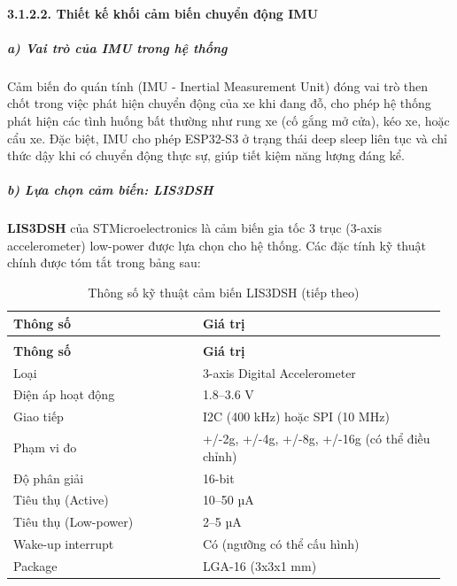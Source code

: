 \documentclass[a4paper]{extarticle}
\newcommand{\thesissettableid}[2]{%
  \renewcommand{\thetable}{#1}%
  \renewcommand{\theHtable}{#2}%
}
\begin{document}
\paragraph{3.1.2.2. Thiết kế khối cảm biến chuyển động
IMU}\label{3212-thiux1ebft-kux1ebf-muxf4-ux111un-cux1ea3m-biux1ebfn-chuyux1ec3n-ux111ux1ed9ng-imu}

\subparagraph{a) Vai trò của IMU trong hệ
thống}\label{a-vai-truxf2-cux1ee7a-imu-trong-hux1ec7-thux1ed1ng}

Cảm biến đo quán tính (IMU - Inertial Measurement Unit) đóng vai trò
then chốt trong việc phát hiện chuyển động của xe khi đang đỗ, cho phép
hệ thống phát hiện các tình huống bất thường như rung xe (cố gắng mở
cửa), kéo xe, hoặc cẩu xe. Đặc biệt, IMU cho phép ESP32-S3 ở trạng thái
deep sleep liên tục và chỉ thức dậy khi có chuyển động thực sự, giúp
tiết kiệm năng lượng đáng kể.

\subparagraph{b) Lựa chọn cảm biến:
LIS3DSH}\label{b-lux1ef1a-chux1ecdn-cux1ea3m-biux1ebfn-lis3dsh}

\textbf{LIS3DSH} của STMicroelectronics là cảm biến gia tốc 3 trục
(3-axis accelerometer) low-power được lựa chọn cho hệ thống. Các đặc
tính kỹ thuật chính được tóm tắt trong bảng sau:


{\thesissettableid{3.7}{tab-ch3-thong-so-ky-thuat-cam-bien-lis3dsh}
\def\LTcaptype{table}
\begin{longtable}{|L{0.426\linewidth}|L{0.542\linewidth}|}
\caption{Thông số kỹ thuật cảm biến LIS3DSH}\label{tab:ch3-thong-so-ky-thuat-cam-bien-lis3dsh}\\
\hline \textbf{Thông số} & \textbf{Giá trị} \\
\hline
\endfirsthead
\caption[]{Thông số kỹ thuật cảm biến LIS3DSH (tiếp theo)}\\
\hline \textbf{Thông số} & \textbf{Giá trị} \\
\hline
\endhead
\hline
\endfoot
\endlastfoot
Loại & 3-axis Digital Accelerometer \\\hline
Điện áp hoạt động & 1.8--3.6 V \\\hline
Giao tiếp & I2C (400 kHz) hoặc SPI (10 MHz) \\\hline
Phạm vi đo & +/-2g, +/-4g, +/-8g, +/-16g (có thể điều chỉnh) \\\hline
Độ phân giải & 16-bit \\\hline
Tiêu thụ (Active) & 10--50 µA \\\hline
Tiêu thụ (Low-power) & 2--5 µA \\\hline
Wake-up interrupt & Có (ngưỡng có thể cấu hình) \\\hline
Package & LGA-16 (3x3x1 mm) \\\hline
\end{longtable}
}
\end{document}
